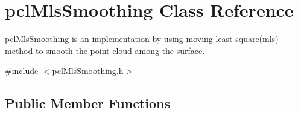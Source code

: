 \hypertarget{classpclMlsSmoothing}{}\section{pcl\+Mls\+Smoothing Class Reference}
\label{classpclMlsSmoothing}


\hyperlink{classpclMlsSmoothing}{pcl\+Mls\+Smoothing} is an implementation by using moving least square(mls) method to smooth the point cloud among the surface.  




{\ttfamily \#include $<$pcl\+Mls\+Smoothing.\+h$>$}

\subsection*{Public Member Functions}
